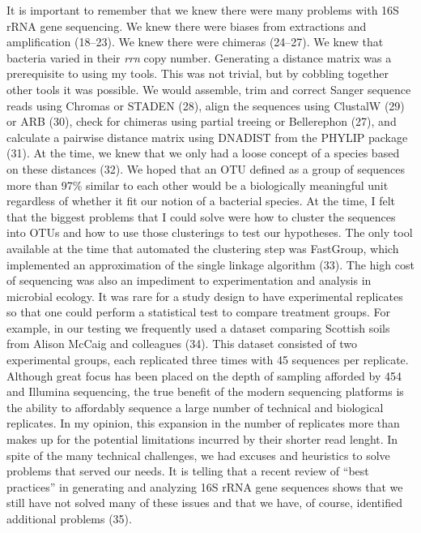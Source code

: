 \documentclass[11pt,]{article}
\begin{document}
It is important to remember that we knew there were many problems with
16S rRNA gene sequencing. We knew there were biases from extractions and
amplification (18--23). We knew there were chimeras (24--27). We knew
that bacteria varied in their \emph{rrn} copy number. Generating a
distance matrix was a prerequisite to using my tools. This was not
trivial, but by cobbling together other tools it was possible. We would
assemble, trim and correct Sanger sequence reads using Chromas or STADEN
(28), align the sequences using ClustalW (29) or ARB (30), check for
chimeras using partial treeing or Bellerephon (27), and calculate a
pairwise distance matrix using DNADIST from the PHYLIP package (31). At
the time, we knew that we only had a loose concept of a species based on
these distances (32). We hoped that an OTU defined as a group of
sequences more than 97\% similar to each other would be a biologically
meaningful unit regardless of whether it fit our notion of a bacterial
species. At the time, I felt that the biggest problems that I could
solve were how to cluster the sequences into OTUs and how to use those
clusterings to test our hypotheses. The only tool available at the time
that automated the clustering step was FastGroup, which implemented an
approximation of the single linkage algorithm (33). The high cost of
sequencing was also an impediment to experimentation and analysis in
microbial ecology. It was rare for a study design to have experimental
replicates so that one could perform a statistical test to compare
treatment groups. For example, in our testing we frequently used a
dataset comparing Scottish soils from Alison McCaig and colleagues (34).
This dataset consisted of two experimental groups, each replicated three
times with 45 sequences per replicate. Although great focus has been
placed on the depth of sampling afforded by 454 and Illumina sequencing,
the true benefit of the modern sequencing platforms is the ability to
affordably sequence a large number of technical and biological
replicates. In my opinion, this expansion in the number of replicates
more than makes up for the potential limitations incurred by their
shorter read lenght. In spite of the many technical challenges, we had
excuses and heuristics to solve problems that served our needs. It is
telling that a recent review of ``best practices'' in generating and
analyzing 16S rRNA gene sequences shows that we still have not solved
many of these issues and that we have, of course, identified additional
problems (35).
\end{document}
